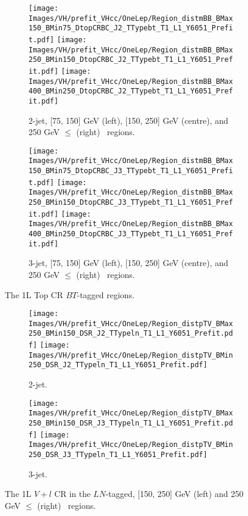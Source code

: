 \begin{figure}[h!]
    \centering
    \begin{subfigure}[b]{\textwidth}
        \centering
        \texttt{[image: Images/VH/prefit\_VHcc/OneLep/Region\_distmBB\_BMax150\_BMin75\_DtopCRBC\_J2\_TTypebt\_T1\_L1\_Y6051\_Prefit.pdf]}
        \texttt{[image: Images/VH/prefit\_VHcc/OneLep/Region\_distmBB\_BMax250\_BMin150\_DtopCRBC\_J2\_TTypebt\_T1\_L1\_Y6051\_Prefit.pdf]}
        \texttt{[image: Images/VH/prefit\_VHcc/OneLep/Region\_distmBB\_BMax400\_BMin250\_DtopCRBC\_J2\_TTypebt\_T1\_L1\_Y6051\_Prefit.pdf]}
        \caption{2-jet, [75, 150] GeV (left), [150, 250] GeV (centre), and 250 GeV $\leq$ (right) \ptv\ regions.}
        \label{fig:plots_VHcc_1L_TopCR_2J}
    \end{subfigure}
    \begin{subfigure}[b]{\textwidth}
        \centering
        \texttt{[image: Images/VH/prefit\_VHcc/OneLep/Region\_distmBB\_BMax150\_BMin75\_DtopCRBC\_J3\_TTypebt\_T1\_L1\_Y6051\_Prefit.pdf]}
        \texttt{[image: Images/VH/prefit\_VHcc/OneLep/Region\_distmBB\_BMax250\_BMin150\_DtopCRBC\_J3\_TTypebt\_T1\_L1\_Y6051\_Prefit.pdf]}
        \texttt{[image: Images/VH/prefit\_VHcc/OneLep/Region\_distmBB\_BMax400\_BMin250\_DtopCRBC\_J3\_TTypebt\_T1\_L1\_Y6051\_Prefit.pdf]}
        \caption{3-jet, [75, 150] GeV (left), [150, 250] GeV (centre), and 250 GeV $\leq$ (right) \ptv\ regions.}
        \label{fig:plots_VHcc_1L_TopCR_3J}
    \end{subfigure}
    \caption{The 1L Top CR $BT$-tagged regions.}
    \label{fig:plots_VHcc_1L_TopCR}
\end{figure}
\begin{figure}[h!]
    \centering
    \begin{subfigure}[b]{\textwidth}
        \centering
        \texttt{[image: Images/VH/prefit\_VHcc/OneLep/Region\_distpTV\_BMax250\_BMin150\_DSR\_J2\_TTypeln\_T1\_L1\_Y6051\_Prefit.pdf]}
        \texttt{[image: Images/VH/prefit\_VHcc/OneLep/Region\_distpTV\_BMin250\_DSR\_J2\_TTypeln\_T1\_L1\_Y6051\_Prefit.pdf]}
        \caption{2-jet.}
        \label{fig:plots_VHcc_1L_LN_2J}
    \end{subfigure}
    \begin{subfigure}[b]{\textwidth}
        \centering
        \texttt{[image: Images/VH/prefit\_VHcc/OneLep/Region\_distpTV\_BMax250\_BMin150\_DSR\_J3\_TTypeln\_T1\_L1\_Y6051\_Prefit.pdf]}
        \texttt{[image: Images/VH/prefit\_VHcc/OneLep/Region\_distpTV\_BMin250\_DSR\_J3\_TTypeln\_T1\_L1\_Y6051\_Prefit.pdf]}
        \caption{3-jet.}
        \label{fig:plots_VHcc_1L_SR_3J}
    \end{subfigure}
    \caption{The 1L $V+l$ CR in the $LN$-tagged, [150, 250] GeV (left) and 250  GeV $\leq$ (right) \ptv\ regions.}
    \label{fig:plots_VHcc_1L_LN}
\end{figure}


